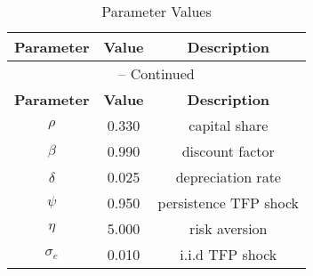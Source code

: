 \begin{center}
\begin{longtable}{ccc}
\caption{Parameter Values}\\%
\toprule%
\multicolumn{1}{c}{\textbf{Parameter}} &
\multicolumn{1}{c}{\textbf{Value}} &
 \multicolumn{1}{c}{\textbf{Description}}\\%
\midrule%
\endfirsthead
\multicolumn{3}{c}{{\tablename} \thetable{} -- Continued}\\%
\midrule%
\multicolumn{1}{c}{\textbf{Parameter}} &
\multicolumn{1}{c}{\textbf{Value}} &
  \multicolumn{1}{c}{\textbf{Description}}\\%
\midrule%
\endhead
${\rho}$ 	 & 	 0.330 	 & 	 capital share\\
${\beta}$ 	 & 	 0.990 	 & 	 discount factor\\
${\delta}$ 	 & 	 0.025 	 & 	 depreciation rate\\
${\psi}$ 	 & 	 0.950 	 & 	 persistence TFP shock\\
${\eta}$ 	 & 	 5.000 	 & 	 risk aversion\\
${\sigma_{e}}$ 	 & 	 0.010 	 & 	 i.i.d TFP shock\\
\bottomrule%
\end{longtable}
\end{center}
